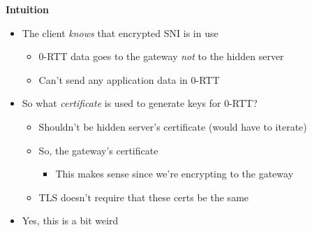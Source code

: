 \documentclass[helvetica]{seminar}
\newcommand{\heading}[1]{%
  \begin{center} 
    \large\bf 
    #1 
  \end{center} 
  \vspace{.4 in}}
\begin{document}
\begin{slide}
\heading{Intuition}

\begin{itemize}
\item The client \emph{knows} that encrypted SNI is in use
  \begin{itemize}
  \item 0-RTT data goes to the gateway \emph{not} to the hidden server
  \item Can't send any application data in 0-RTT
  \end{itemize}

\item So what \emph{certificate} is used to generate keys for 0-RTT?
  \begin{itemize}
  \item Shouldn't be hidden server's certificate (would have to iterate)
  \item So, the gateway's certificate
    \begin{itemize}
    \item This makes sense since we're encrypting to the gateway
    \end{itemize}
  \item TLS doesn't require that these certs be the same
  \end{itemize}

\item Yes, this is a bit weird
\end{itemize}

\end{slide}
\end{document}

